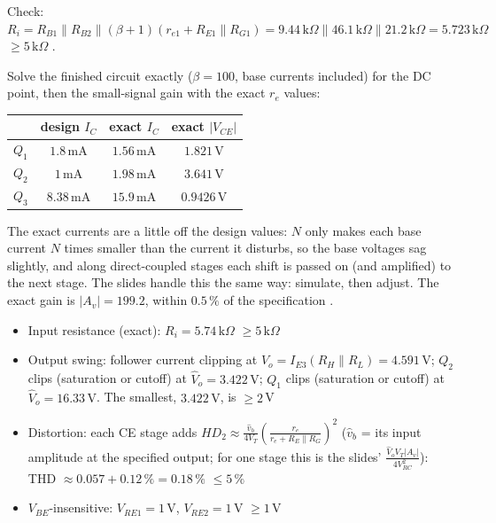 \documentclass[11pt]{article}
\newcommand{\solstep}[2]{\par\medskip{\color{stepc}\textbf{Step #1 --- #2}}\par\nopagebreak}
\begin{document}
Check: $R_i = R_{B1}\|R_{B2}\|(\beta+1)(r_{e1} + R_{E1}\|R_{G1}) = 9.44\,\mathrm{k}\Omega\|46.1\,\mathrm{k}\Omega\|21.2\,\mathrm{k}\Omega = 5.723\,\mathrm{k}\Omega$ $\ge 5\,\mathrm{k}\Omega$ \checkmark.
\solstep{5}{Check by analysis}Solve the finished circuit exactly ($\beta=100$, base currents included) for the DC point, then the small-signal gain with the exact $r_e$ values:\begin{center}\renewcommand{\arraystretch}{1.35}
\begin{tabular}{cccc}
\toprule
 & design $I_C$ & exact $I_C$ & exact $|V_{CE}|$ \\
\midrule
$Q_{1}$ & $1.8\,\mathrm{m}\mathrm{A}$ & $1.56\,\mathrm{m}\mathrm{A}$ & $1.821\,\mathrm{V}$ \\
$Q_{2}$ & $1\,\mathrm{m}\mathrm{A}$ & $1.98\,\mathrm{m}\mathrm{A}$ & $3.641\,\mathrm{V}$ \\
$Q_{3}$ & $8.38\,\mathrm{m}\mathrm{A}$ & $15.9\,\mathrm{m}\mathrm{A}$ & $0.9426\,\mathrm{V}$ \\
\bottomrule
\end{tabular}\end{center}
The exact currents are a little off the design values: $N$ only makes each base current $N$ times smaller than the current it disturbs, so the base voltages sag slightly, and along direct-coupled stages each shift is passed on (and amplified) to the next stage. The slides handle this the same way: simulate, then adjust. The exact gain is $|A_v| = 199.2$, within $0.5\,\%$ of the specification \checkmark. \begin{itemize}[leftmargin=*,itemsep=2pt]
\item Input resistance (exact): $R_i = 5.74\,\mathrm{k}\Omega$ $\ge 5\,\mathrm{k}\Omega$ \checkmark
\item Output swing: follower current clipping at $\hat V_o = I_{E3}(R_H\|R_L) = 4.591\,\mathrm{V}$; $Q_{2}$ clips (saturation or cutoff) at $\hat V_o = 3.422\,\mathrm{V}$; $Q_{1}$ clips (saturation or cutoff) at $\hat V_o = 16.33\,\mathrm{V}$. The smallest, $3.422\,\mathrm{V}$, is $\ge 2$\,V \checkmark
\item Distortion: each CE stage adds $HD_2 \approx \frac{\hat v_b}{4V_T}\left(\frac{r_e}{r_e + R_E\|R_G}\right)^2$ ($\hat v_b$ = its input amplitude at the specified output; for one stage this is the slides' $\frac{\hat V_o V_T |A_v|}{4V_{RC}^2}$): THD $\approx 0.057 + 0.12\,\% = 0.18\,\%$ $\le 5\,\%$ \checkmark
\item $V_{BE}$-insensitive: $V_{RE1} = 1$\,V, $V_{RE2} = 1$\,V $\ge 1$\,V \checkmark
\end{itemize}
\end{document}
